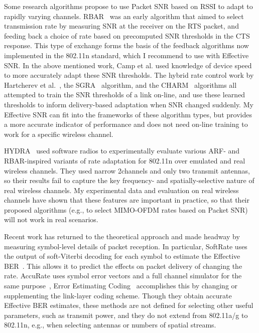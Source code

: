 Some research algorithms propose to use Packet SNR based on RSSI to adapt to rapidly varying channels. RBAR~\cite{Holland_RBAR} was an early algorithm that aimed to select transmission rate by measuring SNR at the receiver on the RTS packet, and feeding back a choice of rate based on precomputed SNR thresholds in the CTS response. This type of exchange forms the basis of the feedback algorithms now implemented in the 802.11n standard, which I recommend to use with Effective SNR. In the above mentioned work, Camp et al. used knowledge of device speed to more accurately adapt these SNR thresholds. The hybrid rate control work by Hartcherev et al.~\cite{Haratcherev_Hybrid}, the SGRA~\cite{Zhang_SNRguided} algorithm, and the CHARM~\cite{Judd_CHARM} algorithms all attempted to train the SNR thresholds of a link on-line, and use these learned thresholds to inform delivery-based adaptation when SNR changed suddenly. My Effective SNR can fit into the frameworks of these algorithm types, but provides a more accurate indicator of performance and does not need on-line training to work for a specific wireless channel.

HYDRA~\cite{Kim_Hydra} used software radios to experimentally evaluate various ARF- and RBAR-inspired variants of rate adaptation for 802.11n over emulated and real wireless channels. They used narrow 2\MHz channels and only two transmit antennas, so their results fail to capture the key frequency- and spatially-selective nature of real wireless channels. My experimental data and evaluation on real wireless channels have shown that these features are important in practice, so that their proposed algorithms (e.g., to select MIMO-OFDM rates based on Packet SNR) will not work in real scenarios. 

Recent work has returned to the theoretical approach and made headway by measuring symbol-level details of packet reception. In particular, SoftRate uses the output of soft-Viterbi decoding for each symbol to estimate the Effective BER~\cite{Vutukuru_SoftRate}. This allows it to predict the effects on packet delivery of changing the rate. AccuRate uses symbol error vectors and a full channel simulator for the same purpose~\cite{Sen_AccuRate}, Error Estimating Coding~\cite{Chen_EEC} accomplishes this by changing or supplementing the link-layer coding scheme. Though they obtain accurate Effective BER estimates, these methods are not defined for selecting other useful parameters, such as transmit power, and they do not extend from 802.11a/g to 802.11n, e.g., when selecting antennas or numbers of spatial streams.

